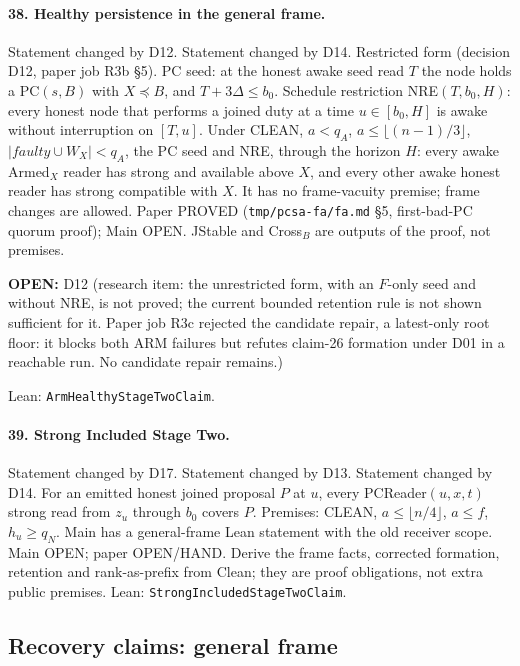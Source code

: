 \documentclass{article}
\newcommand{\OPEN}[1]{\par\noindent\textbf{OPEN:} #1\par}
\newcommand{\nm}[1]{\nolinkurl{#1}}
\begin{document}
\paragraph{38. Healthy persistence in the general frame.}
Statement changed by D12. Statement changed by D14.
Restricted form (decision D12, paper job R3b \S5). PC seed: at the honest
awake seed read $T$ the node holds a PC$(s,B)$ with $X\preceq B$, and
$T+3\Delta\leq b_0$. Schedule restriction
NRE$(T,b_0,H)$: every honest node that performs a joined duty at a time
$u\in[b_0,H]$ is awake without interruption on $[T,u]$. Under CLEAN,
$a<q_A$, $a\leq\lfloor(n-1)/3\rfloor$, $|\mathit{faulty}\cup W_X|<q_A$,
the PC seed and NRE, through the horizon $H$: every awake Armed$_X$ reader
has strong and available above $X$, and every other awake honest reader
has strong compatible with $X$. It has no frame-vacuity premise; frame
changes are allowed. Paper PROVED (\nm{tmp/pcsa-fa/fa.md} \S5, first-bad-PC quorum proof); Main OPEN.
JStable and Cross$_B$ are outputs of the proof, not premises.
\OPEN{D12 (research item: the unrestricted form, with an $F$-only seed
and without NRE, is not proved; the current bounded retention rule is not
shown sufficient for it. Paper job R3c rejected the candidate repair, a
latest-only root floor: it blocks both ARM failures but refutes claim-26
formation under D01 in a reachable run. No candidate repair remains.)}
Lean: \nm{ArmHealthyStageTwoClaim}.

\paragraph{39. Strong Included Stage Two.}
Statement changed by D17.
Statement changed by D13. Statement changed by D14.
For an emitted honest joined proposal $P$ at $u$, every PCReader$(u,x,t)$ strong read from $z_u$ through $b_0$ covers $P$. Premises: CLEAN, $a\leq\lfloor n/4\rfloor$, $a\leq f$, $h_u\geq q_N$. Main has a general-frame Lean statement with the old receiver scope. Main OPEN; paper OPEN/HAND. Derive the frame facts, corrected formation, retention and rank-as-prefix from Clean; they are proof obligations, not extra public premises.
Lean: \nm{StrongIncludedStageTwoClaim}.

\subsection{Recovery claims: general frame}
\end{document}
